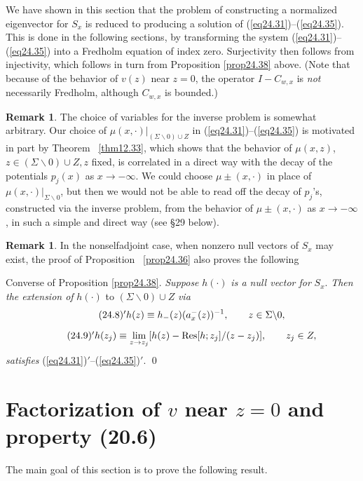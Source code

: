 \documentclass{surv-l}
\theoremstyle{plain}
\theoremstyle{definition}
\newtheorem{remark}[theorem]{Remark}
\numberwithin{equation}{chapter}
\begin{document}
We have shown in this section that the problem of constructing a normalized eigenvector for $S_{x}$ is reduced to producing a solution of (\ref{eq24.31})--(\ref{eq24.35}). This is done in the following sections, by transforming the system (\ref{eq24.31})--(\ref{eq24.35}) into a Fredholm equation of index zero. Surjectivity then follows from injectivity, which follows in turn from Proposition \ref{prop24.38} above. (Note that because of the behavior of $v(z)$ near $z=0$, the operator $I-C_{w,x}$ is \emph{not} necessarily Fredholm, although $C_{w,x}$ is bounded.)

\begin{remark}\label{rem24.40}
The choice of variables for the inverse problem is somewhat arbitrary. Our choice of $\mu(x,\cdot)|_{(\Sigma\backslash 0)\cup Z}$ in (\ref{eq24.31})--(\ref{eq24.35}) is motivated in part by Theorem ~\ref{thm12.33}, which shows that the behavior of $\mu(x, z)$, $z\in(\Sigma\backslash 0)\cup Z, z$ fixed, is correlated in a direct way with the decay of the potentials $p_{j}(x)$ as $ x\rightarrow-\infty$. We could choose $\mu\pm(x,\cdot)$ in place of $\mu(x, \cdot)|_{\Sigma\backslash 0}$, but then we would not be able to read off the decay of $p_{j}$'s, constructed via the inverse problem, from the behavior of $\mu\pm(x, \cdot)$ as $x\rightarrow-\infty$, in such a simple and direct way (see \S 29 below).
\end{remark}

\begin{remark}\label{rem24.41}
In the nonselfadjoint case, when nonzero null vectors of $S_{x}$ may exist, the proof of Proposition ~\ref{prop24.36} also proves the following
\end{remark}

{\sc Converse of Proposition} \ref{prop24.38}.
\emph{Suppose} $h(\cdot)$ \emph{is a null vector for} $S_{x}$. \emph{Then the extension of} $h(\cdot)$ to $(\Sigma\backslash 0)\cup Z$ \emph{via}
\begin{equation*}
\tag*{$(24.8)^{\prime}$}  h(z)\equiv h_{-}(z)(a_{x}^{-}(z))^{-1},\qquad z\in\Sigma\backslash 0,
\end{equation*}

\begin{equation*}
\tag*{$(24.9)^{\prime}$}  h(z_{j})\displaystyle \equiv\lim_{z\rightarrow z_{j}}[h(z)-{\mathrm{Res}}[h;z_{j}]/(z-z_{j})],\qquad z_{j}\in Z,
\end{equation*}
\emph{satisfies} (\ref{eq24.31})$'$--(\ref{eq24.35})$'$. \qed


\section[Factorization of $v$ near $z=0$ and Property (20.6)]{Factorization of $v$ near $z=0$ and property (20.6)}\label{sec25} The main goal of this section is to prove the following result.
\end{document}
